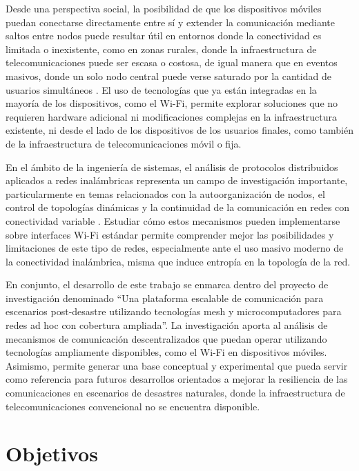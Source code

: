 \documentclass[12pt,oneside]{scrreprt}
\begin{document}
Desde una perspectiva social, la posibilidad de que los dispositivos móviles puedan conectarse directamente entre sí y extender la comunicación mediante saltos entre nodos puede resultar útil en entornos donde la conectividad es limitada o inexistente, como en zonas rurales, donde la infraestructura de telecomunicaciones puede ser escasa o costosa, de igual manera que en eventos masivos, donde un solo nodo central puede verse saturado por la cantidad de usuarios simultáneos \parencite{Appiahene2019}. El uso de tecnologías que ya están integradas en la mayoría de los dispositivos, como el Wi-Fi, permite explorar soluciones que no requieren hardware adicional ni modificaciones complejas en la infraestructura existente, ni desde el lado de los dispositivos de los usuarios finales, como también de la infraestructura de telecomunicaciones móvil o fija.

En el ámbito de la ingeniería de sistemas, el análisis de protocolos distribuidos aplicados a redes inalámbricas representa un campo de investigación importante, particularmente en temas relacionados con la autoorganización de nodos, el control de topologías dinámicas y la continuidad de la comunicación en redes con conectividad variable \parencite{Gupta2000,Karl2005}. Estudiar cómo estos mecanismos pueden implementarse sobre interfaces Wi-Fi estándar permite comprender mejor las posibilidades y limitaciones de este tipo de redes, especialmente ante el uso masivo moderno de la conectividad inalámbrica, misma que induce entropía en la topología de la red.

En conjunto, el desarrollo de este trabajo se enmarca dentro del proyecto de investigación denominado \enquote{Una plataforma escalable de comunicación para escenarios post-desastre utilizando tecnologías mesh y microcomputadores para redes ad hoc con cobertura ampliada}. La investigación aporta al análisis de mecanismos de comunicación descentralizados que puedan operar utilizando tecnologías ampliamente disponibles, como el Wi-Fi en dispositivos móviles. Asimismo, permite generar una base conceptual y experimental que pueda servir como referencia para futuros desarrollos orientados a mejorar la resiliencia de las comunicaciones en escenarios de desastres naturales, donde la infraestructura de telecomunicaciones convencional no se encuentra disponible.

\section{Objetivos}
\end{document}
